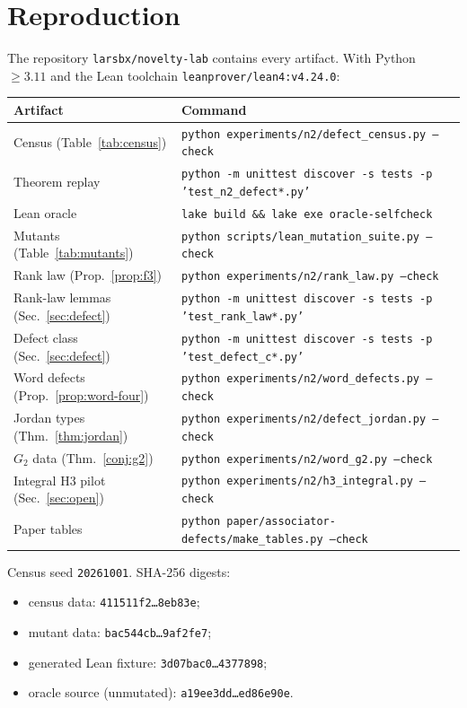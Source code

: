 \documentclass[11pt]{amsart}
\theoremstyle{definition}
\theoremstyle{remark}
\begin{document}
\appendix
\section{Reproduction}\label{app:repro}

The repository \texttt{larsbx/novelty-lab} contains every artifact. With
Python~$\ge3.11$ and the Lean toolchain \texttt{leanprover/lean4:v4.24.0}:
\begin{center}
\small
\begin{tabular}{ll}
\toprule
Artifact & Command \\
\midrule
Census (Table~\ref{tab:census}) & \texttt{python experiments/n2/defect\_census.py --check} \\
Theorem replay & \texttt{python -m unittest discover -s tests -p 'test\_n2\_defect*.py'} \\
Lean oracle & \texttt{lake build \&\& lake exe oracle-selfcheck} \\
Mutants (Table~\ref{tab:mutants}) & \texttt{python scripts/lean\_mutation\_suite.py --check} \\
Rank law (Prop.~\ref{prop:f3}) & \texttt{python experiments/n2/rank\_law.py --check} \\
Rank-law lemmas (Sec.~\ref{sec:defect}) & \texttt{python -m unittest discover -s tests -p 'test\_rank\_law*.py'} \\
Defect class (Sec.~\ref{sec:defect}) & \texttt{python -m unittest discover -s tests -p 'test\_defect\_c*.py'} \\
Word defects (Prop.~\ref{prop:word-four}) & \texttt{python experiments/n2/word\_defects.py --check} \\
Jordan types (Thm.~\ref{thm:jordan}) & \texttt{python experiments/n2/defect\_jordan.py --check} \\
$G_2$ data (Thm.~\ref{conj:g2}) & \texttt{python experiments/n2/word\_g2.py --check} \\
Integral H3 pilot (Sec.~\ref{sec:open}) & \texttt{python experiments/n2/h3\_integral.py --check} \\
Paper tables & \texttt{python paper/associator-defects/make\_tables.py --check} \\
\bottomrule
\end{tabular}
\end{center}
Census seed \texttt{20261001}. SHA-256 digests:
\begin{itemize}
\item census data: \texttt{411511f2\ldots8eb83e};
\item mutant data: \texttt{bac544cb\ldots9af2fe7};
\item generated Lean fixture: \texttt{3d07bac0\ldots4377898};
\item oracle source (unmutated): \texttt{a19ee3dd\ldots ed86e90e}.
\end{itemize}
\end{document}
